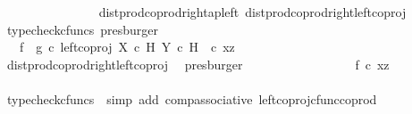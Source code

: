 \begin{isabellebody}
\ \ \ \ \ \ \ \ \ \ \ \ \ \ \isamarkupfalse%
\ dist{\isacharunderscore}{\kern0pt}prod{\isacharunderscore}{\kern0pt}coprod{\isacharunderscore}{\kern0pt}right{\isacharunderscore}{\kern0pt}ap{\isacharunderscore}{\kern0pt}left\ dist{\isacharunderscore}{\kern0pt}prod{\isacharunderscore}{\kern0pt}coprod{\isacharunderscore}{\kern0pt}right{\isacharunderscore}{\kern0pt}left{\isacharunderscore}{\kern0pt}coproj\ \isamarkupfalse%
\ {\isacharparenleft}{\kern0pt}typecheck{\isacharunderscore}{\kern0pt}cfuncs{\isacharcomma}{\kern0pt}\ presburger{\isacharparenright}{\kern0pt}\isanewline
\ \ \ \ \ \ \ \ \ \ \ \ \isamarkupfalse%
\ \isamarkupfalse%
\ {\isachardoublequoteopen}{\isachardot}{\kern0pt}{\isachardot}{\kern0pt}{\isachardot}{\kern0pt}\ {\isacharequal}{\kern0pt}\ {\isacharparenleft}{\kern0pt}f\isactrlsup {\isasymflat}\ {\isasymamalg}\ g\isactrlsup {\isasymflat}{\isacharparenright}{\kern0pt}\ {\isasymcirc}\isactrlsub c\ {\isacharparenleft}{\kern0pt}left{\isacharunderscore}{\kern0pt}coproj\ {\isacharparenleft}{\kern0pt}X\ {\isasymtimes}\isactrlsub c\ H{\isacharparenright}{\kern0pt}\ {\isacharparenleft}{\kern0pt}Y\ {\isasymtimes}\isactrlsub c\ H{\isacharparenright}{\kern0pt}\ \ {\isasymcirc}\isactrlsub c\ {\isasymlangle}x{\isacharcomma}{\kern0pt}z{\isasymrangle}{\isacharparenright}{\kern0pt}{\isachardoublequoteclose}\isanewline
\ \ \ \ \ \ \ \ \ \ \ \ \ \ \isamarkupfalse%
\ dist{\isacharunderscore}{\kern0pt}prod{\isacharunderscore}{\kern0pt}coprod{\isacharunderscore}{\kern0pt}right{\isacharunderscore}{\kern0pt}left{\isacharunderscore}{\kern0pt}coproj\ \isamarkupfalse%
\ presburger\isanewline
\ \ \ \ \ \ \ \ \ \ \ \ \isamarkupfalse%
\ \isamarkupfalse%
\ {\isachardoublequoteopen}{\isachardot}{\kern0pt}{\isachardot}{\kern0pt}{\isachardot}{\kern0pt}\ {\isacharequal}{\kern0pt}\ f\isactrlsup {\isasymflat}\ {\isasymcirc}\isactrlsub c\ {\isasymlangle}x{\isacharcomma}{\kern0pt}z{\isasymrangle}{\isachardoublequoteclose}\isanewline
\ \ \ \ \ \ \ \ \ \ \ \ \ \ \isamarkupfalse%
\ {\isacharparenleft}{\kern0pt}typecheck{\isacharunderscore}{\kern0pt}cfuncs{\isacharcomma}{\kern0pt}\ \ simp\ add{\isacharcolon}{\kern0pt}\ comp{\isacharunderscore}{\kern0pt}associative{}\ left{\isacharunderscore}{\kern0pt}coproj{\isacharunderscore}{\kern0pt}cfunc{\isacharunderscore}{\kern0pt}coprod{\isacharparenright}{\kern0pt}\isanewline
\ \ \ \ \ \ \ \ \ \ \ \ \isamarkupfalse%
\ \isamarkupfalse%

\end{isabellebody}
